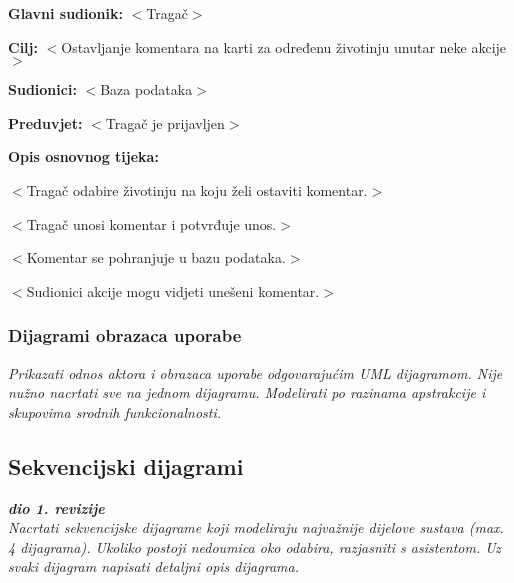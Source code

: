 					\noindent {}
					\begin{packed_item}
						
						\item \textbf{Glavni sudionik: }$<$Tragač$>$
						\item  \textbf{Cilj:} $<$Ostavljanje komentara na karti za određenu životinju unutar neke akcije$>$
						\item  \textbf{Sudionici:} $<$Baza podataka$>$
						\item  \textbf{Preduvjet:} $<$Tragač je prijavljen$>$
						\item  \textbf{Opis osnovnog tijeka:}
						
						\item[] \begin{packed_enum}
							
							\item $<$Tragač odabire životinju na koju želi ostaviti komentar.$>$
							\item $<$Tragač unosi komentar i potvrđuje unos.$>$
							\item $<$Komentar se pohranjuje u bazu podataka.$>$
							\item $<$Sudionici akcije mogu vidjeti unešeni komentar.$>$
						\end{packed_enum}
						
					\end{packed_item}
				
					
				\subsubsection{Dijagrami obrazaca uporabe}
					
					\textit{Prikazati odnos aktora i obrazaca uporabe odgovarajućim UML dijagramom. Nije nužno nacrtati sve na jednom dijagramu. Modelirati po razinama apstrakcije i skupovima srodnih funkcionalnosti.}
				\eject		
				
			\subsection{Sekvencijski dijagrami}
				
				\textbf{\textit{dio 1. revizije}}\\
				
				\textit{Nacrtati sekvencijske dijagrame koji modeliraju najvažnije dijelove sustava (max. 4 dijagrama). Ukoliko postoji nedoumica oko odabira, razjasniti s asistentom. Uz svaki dijagram napisati detaljni opis dijagrama.}
				\eject
	
